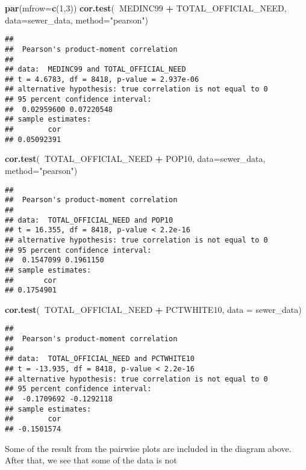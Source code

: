 \documentclass[]{article}
\newenvironment{Shaded}{\begin{snugshade}}{\end{snugshade}}
\newcommand{\KeywordTok}[1]{\textcolor[rgb]{0.13,0.29,0.53}{\textbf{#1}}}
\newcommand{\DataTypeTok}[1]{\textcolor[rgb]{0.13,0.29,0.53}{#1}}
\newcommand{\DecValTok}[1]{\textcolor[rgb]{0.00,0.00,0.81}{#1}}
\newcommand{\StringTok}[1]{\textcolor[rgb]{0.31,0.60,0.02}{#1}}
\newcommand{\OperatorTok}[1]{\textcolor[rgb]{0.81,0.36,0.00}{\textbf{#1}}}
\newcommand{\NormalTok}[1]{#1}
\begin{document}
\begin{Shaded}
\begin{Highlighting}[]
\KeywordTok{par}\NormalTok{(}\DataTypeTok{mfrow=}\KeywordTok{c}\NormalTok{(}\DecValTok{1}\NormalTok{,}\DecValTok{3}\NormalTok{))}
\KeywordTok{cor.test}\NormalTok{(}\OperatorTok{~}\NormalTok{MEDINC99 }\OperatorTok{+}\StringTok{ }\NormalTok{TOTAL_OFFICIAL_NEED, }\DataTypeTok{data=}\NormalTok{sewer_data, }\DataTypeTok{method=}\StringTok{"pearson"}\NormalTok{)}
\end{Highlighting}
\end{Shaded}

\begin{verbatim}
## 
##  Pearson's product-moment correlation
## 
## data:  MEDINC99 and TOTAL_OFFICIAL_NEED
## t = 4.6783, df = 8418, p-value = 2.937e-06
## alternative hypothesis: true correlation is not equal to 0
## 95 percent confidence interval:
##  0.02959600 0.07220548
## sample estimates:
##        cor 
## 0.05092391
\end{verbatim}

\begin{Shaded}
\begin{Highlighting}[]
\KeywordTok{cor.test}\NormalTok{(}\OperatorTok{~}\NormalTok{TOTAL_OFFICIAL_NEED }\OperatorTok{+}\StringTok{ }\NormalTok{POP10, }\DataTypeTok{data=}\NormalTok{sewer_data, }\DataTypeTok{method=}\StringTok{"pearson"}\NormalTok{)}
\end{Highlighting}
\end{Shaded}

\begin{verbatim}
## 
##  Pearson's product-moment correlation
## 
## data:  TOTAL_OFFICIAL_NEED and POP10
## t = 16.355, df = 8418, p-value < 2.2e-16
## alternative hypothesis: true correlation is not equal to 0
## 95 percent confidence interval:
##  0.1547099 0.1961150
## sample estimates:
##       cor 
## 0.1754901
\end{verbatim}

\begin{Shaded}
\begin{Highlighting}[]
\KeywordTok{cor.test}\NormalTok{(}\OperatorTok{~}\NormalTok{TOTAL_OFFICIAL_NEED }\OperatorTok{+}\StringTok{ }\NormalTok{PCTWHITE10, }\DataTypeTok{data =}\NormalTok{ sewer_data)}
\end{Highlighting}
\end{Shaded}

\begin{verbatim}
## 
##  Pearson's product-moment correlation
## 
## data:  TOTAL_OFFICIAL_NEED and PCTWHITE10
## t = -13.935, df = 8418, p-value < 2.2e-16
## alternative hypothesis: true correlation is not equal to 0
## 95 percent confidence interval:
##  -0.1709692 -0.1292118
## sample estimates:
##        cor 
## -0.1501574
\end{verbatim}

Some of the result from the pairwise plots are included in the diagram
above. After that, we see that some of the data is not
\end{document}

